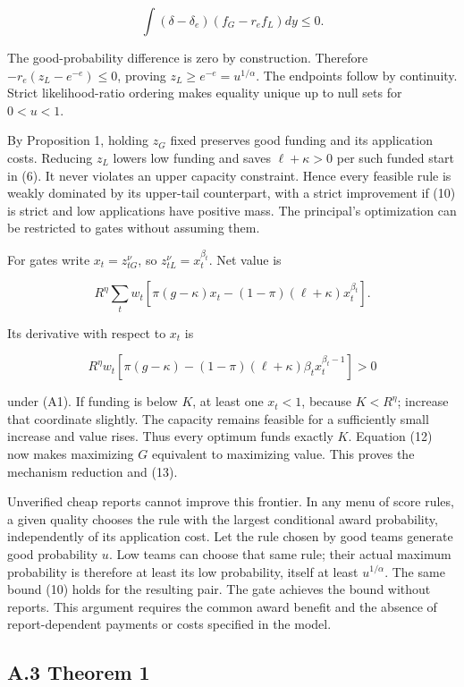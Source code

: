 \documentclass[
  11pt,
]{article}
\begin{document}
\[\int(\delta-\delta_e)(f_G-r_e f_L)dy\leq0.\]

The good-probability difference is zero by construction. Therefore
\(-r_e(z_L-e^{-e})\leq0\), proving \(z_L\geq e^{-e}=u^{1/\alpha}\). The
endpoints follow by continuity. Strict likelihood-ratio ordering makes
equality unique up to null sets for \(0<u<1\).

By Proposition 1, holding \(z_G\) fixed preserves good funding and its
application costs. Reducing \(z_L\) lowers low funding and saves
\(\ell+\kappa>0\) per such funded start in (6). It never violates an
upper capacity constraint. Hence every feasible rule is weakly dominated
by its upper-tail counterpart, with a strict improvement if (10) is
strict and low applications have positive mass. The principal's
optimization can be restricted to gates without assuming them.

For gates write \(x_t=z_{tG}^\nu\), so \(z_{tL}^\nu=x_t^{\beta_t}\). Net
value is

\[R^\eta\sum_t w_t[\pi(g-\kappa)x_t-(1-\pi)(\ell+\kappa)x_t^{\beta_t}].\]

Its derivative with respect to \(x_t\) is

\[R^\eta w_t[\pi(g-\kappa)-(1-\pi)(\ell+\kappa)\beta_t x_t^{\beta_t-1}]>0\]

under (A1). If funding is below \(K\), at least one \(x_t<1\), because
\(K<R^\eta\); increase that coordinate slightly. The capacity remains
feasible for a sufficiently small increase and value rises. Thus every
optimum funds exactly \(K\). Equation (12) now makes maximizing \(G\)
equivalent to maximizing value. This proves the mechanism reduction and
(13).

Unverified cheap reports cannot improve this frontier. In any menu of
score rules, a given quality chooses the rule with the largest
conditional award probability, independently of its application cost.
Let the rule chosen by good teams generate good probability \(u\). Low
teams can choose that same rule; their actual maximum probability is
therefore at least its low probability, itself at least
\(u^{1/\alpha}\). The same bound (10) holds for the resulting pair. The
gate achieves the bound without reports. This argument requires the
common award benefit and the absence of report-dependent payments or
costs specified in the model.

\subsection{A.3 Theorem 1}\label{a.3-theorem-1}
\end{document}
